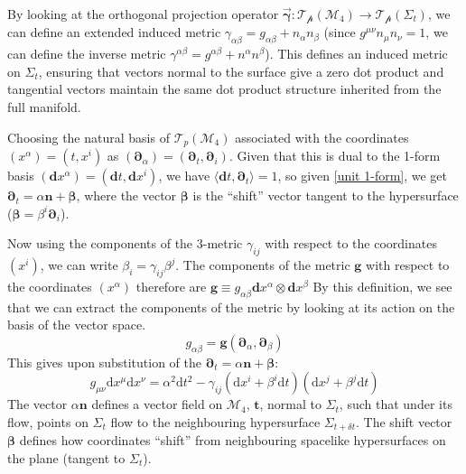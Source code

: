 \documentclass[aps,prd,reprint,preprintnumbers,showpacs,floatfix,nofootinbib,superscript address]{revtex4-2}
\begin{document}
By looking at the orthogonal projection operator $\Vec{\mathbf{\gamma}} : \mathcal{T_p}(\mathcal{M}_4) \rightarrow \mathcal{T_p}(\Sigma_t)$, we can define an extended induced metric $\gamma_{\alpha\beta} = g_{\alpha\beta} + n_\alpha n_\beta$ (since $g^{\mu\nu} n_\mu n_\nu = 1$, we can define the inverse metric $\gamma^{\alpha\beta} = g^{\alpha\beta} + n^\alpha n^\beta$). This defines an induced metric on $\Sigma_t$, ensuring that vectors normal to the surface give a zero dot product and tangential vectors maintain the same dot product structure inherited from the full manifold. 

Choosing the natural basis of $\mathcal{T}_p(\mathcal{M}_4)$ associated with the coordinates $(x^\alpha) =(t,x^i)$ as $(\bm{\partial}_\alpha)=(\bm{\partial}_t, \bm{\partial}_i)$. Given that this is dual to the 1-form basis $(\textbf{d}x^\alpha) = (\textbf{d}t, \textbf{d}x^i)$, we have $\langle \textbf{d}t, \bm{\partial}_t \rangle = 1$, so given \cref{unit 1-form}, we get $\bm{\partial}_t = \alpha \bm{n} + \bm{\beta}$, where the vector $\bm{\beta}$ is the ``shift'' vector tangent to the hypersurface ($\bm{\beta} = \beta^i \boldsymbol{\partial}_i$). 

Now using the components of the 3-metric $\gamma_{i j}$ with respect to the coordinates $(x^i)$, we can write $\beta_i = \gamma_{ij}\beta^j$. The components of the metric $\bm{g}$ with respect to the coordinates $(x^\alpha)$ therefore are $\bm{g} \equiv g_{\alpha \beta} \textbf{d}x^\alpha \otimes \textbf{d}x^\beta$
By this definition, we see that we can extract the components of the metric by looking at its action on the basis of the vector space. 
\begin{equation}
    g_{\alpha\beta} = \bm{g} (\bm{\partial}_\alpha, \bm{\partial}_\beta)
\end{equation}
This gives upon substitution of the $\bm{\partial}_t = \alpha \bm{n} + \bm{\beta}$:
\begin{equation} \label{General split Metric}
    g_{\mu \nu} \text{d}x^\mu\text{d}x^\nu = \alpha^2 \text{d}t^2 - \gamma_{ij}(\text{d}x^i + \beta^i \text{d}t)(\text{d}x^j + \beta^j \text{d}t)
\end{equation}
The vector $\alpha \bm{n}$ defines a vector field on $\mathcal{M}_4$, $\bm{t}$, normal to $\Sigma_t$, such that under its flow, points on $\Sigma_t$ flow to the neighbouring hypersurface $\Sigma_{t+\delta t}$. The shift vector $\bm{\beta}$ defines how coordinates ``shift'' from neighbouring spacelike hypersurfaces on the plane (tangent to $\Sigma_t$). 
\end{document}
